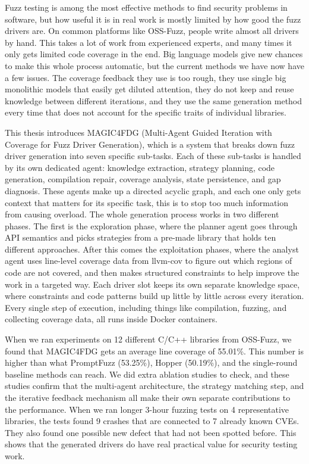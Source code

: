 \documentclass[
    fontset = mac %
  ]{njuthesis}
\begin{document}
\begin{abstract*}
  Fuzz testing is among the most effective methods to find security problems in software, but how useful it is in real work is mostly limited by how good the fuzz drivers are. On common platforms like OSS-Fuzz, people write almost all drivers by hand. This takes a lot of work from experienced experts, and many times it only gets limited code coverage in the end. Big language models give new chances to make this whole process automatic, but the current methods we have now have a few issues. The coverage feedback they use is too rough, they use single big monolithic models that easily get diluted attention, they do not keep and reuse knowledge between different iterations, and they use the same generation method every time that does not account for the specific traits of individual libraries.

  This thesis introduces MAGIC4FDG (Multi-Agent Guided Iteration with Coverage for Fuzz Driver Generation), which is a system that breaks down fuzz driver generation into seven specific sub-tasks. Each of these sub-tasks is handled by its own dedicated agent: knowledge extraction, strategy planning, code generation, compilation repair, coverage analysis, state persistence, and gap diagnosis. These agents make up a directed acyclic graph, and each one only gets context that matters for its specific task, this is to stop too much information from causing overload. The whole generation process works in two different phases. The first is the exploration phase, where the planner agent goes through API semantics and picks strategies from a pre-made library that holds ten different approaches. After this comes the exploitation phases, where the analyst agent uses line-level coverage data from llvm-cov to figure out which regions of code are not covered, and then makes structured constraints to help improve the work in a targeted way. Each driver slot keeps its own separate knowledge space, where constraints and code patterns build up little by little across every iteration. Every single step of execution, including things like compilation, fuzzing, and collecting coverage data, all runs inside Docker containers.
  
  When we ran experiments on 12 different C/C++ libraries from OSS-Fuzz, we found that MAGIC4FDG gets an average line coverage of 55.01\%. This number is higher than what PromptFuzz (53.25\%), Hopper (50.19\%), and the single-round baseline methods can reach. We did extra ablation studies to check, and these studies confirm that the multi-agent architecture, the strategy matching step, and the iterative feedback mechanism all make their own separate contributions to the performance. When we ran longer 3-hour fuzzing tests on 4 representative libraries, the tests found 9 crashes that are connected to 7 already known CVEs. They also found one possible new defect that had not been spotted before. This shows that the generated drivers do have real practical value for security testing work.
\end{abstract*}
\end{document}
